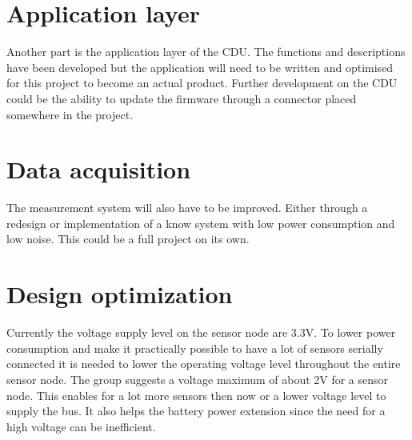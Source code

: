 \section{Application layer}
Another part is the application layer of the CDU. The functions and descriptions have been developed but the application will need to be written and optimised for this project to become an actual product. Further development on the CDU could be the ability to update the firmware through a connector placed somewhere in the project.

\section{Data acquisition}
The measurement system will also have to be improved. Either through a redesign or implementation of a know system with low power consumption and low noise. This could be a full project on its own.

\section{Design optimization}
\label{sec:DO}
Currently the voltage supply level on the sensor node are 3.3V. To lower power consumption and make it practically possible to have a lot of sensors serially connected it is needed to lower the operating voltage level throughout the entire sensor node. The group suggests a voltage maximum of about 2V for a sensor node. This enables for a lot more sensors then now or a lower voltage level to supply the bus. It also helps the battery power extension since the need for a high voltage can be inefficient.
